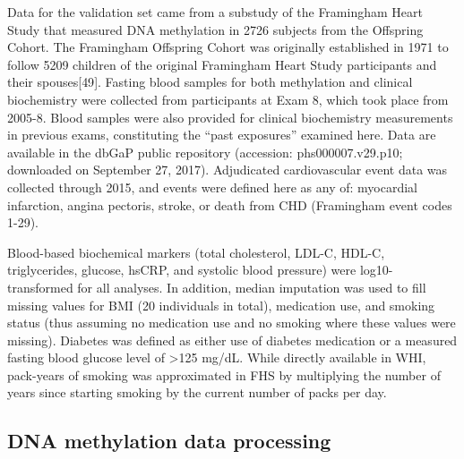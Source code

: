 \documentclass[]{article}
\theoremstyle{definition}
\theoremstyle{definition}
\theoremstyle{definition}
\theoremstyle{remark}
\begin{document}
Data for the validation set came from a substudy of the Framingham Heart
Study that measured DNA methylation in 2726 subjects from the Offspring
Cohort. The Framingham Offspring Cohort was originally established in
1971 to follow 5209 children of the original Framingham Heart Study
participants and their spouses{[}49{]}. Fasting blood samples for both
methylation and clinical biochemistry were collected from participants
at Exam 8, which took place from 2005-8. Blood samples were also
provided for clinical biochemistry measurements in previous exams,
constituting the ``past exposures'' examined here. Data are available in
the dbGaP public repository (accession: phs000007.v29.p10; downloaded on
September 27, 2017). Adjudicated cardiovascular event data was collected
through 2015, and events were defined here as any of: myocardial
infarction, angina pectoris, stroke, or death from CHD (Framingham event
codes 1-29).

Blood-based biochemical markers (total cholesterol, LDL-C, HDL-C,
triglycerides, glucose, hsCRP, and systolic blood pressure) were
log10-transformed for all analyses. In addition, median imputation was
used to fill missing values for BMI (20 individuals in total),
medication use, and smoking status (thus assuming no medication use and
no smoking where these values were missing). Diabetes was defined as
either use of diabetes medication or a measured fasting blood glucose
level of \textgreater{}125 mg/dL. While directly available in WHI,
pack-years of smoking was approximated in FHS by multiplying the number
of years since starting smoking by the current number of packs per day.

\subsection{DNA methylation data
processing}\label{dna-methylation-data-processing}
\end{document}
